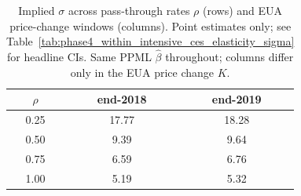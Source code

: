 \begin{table}[ht]
\centering
\caption{Implied $\sigma$ across pass-through rates $\rho$ (rows) and EUA price-change windows (columns). Point estimates only; see Table~\ref{tab:phase4_within_intensive_ces_elasticity_sigma} for headline CIs. Same PPML $\hat\beta$ throughout; columns differ only in the EUA price change $K$.} 
\label{tab:phase4_within_intensive_ces_elasticity_robustness}
\begin{tabular}{ccc}
  \toprule
$\rho$ & end-2018 & end-2019 \\ 
  \midrule
0.25 & 17.77 & 18.28 \\ 
  0.50 & 9.39 & 9.64 \\ 
  0.75 & 6.59 & 6.76 \\ 
  1.00 & 5.19 & 5.32 \\ 
   \bottomrule
\end{tabular}
\end{table}
